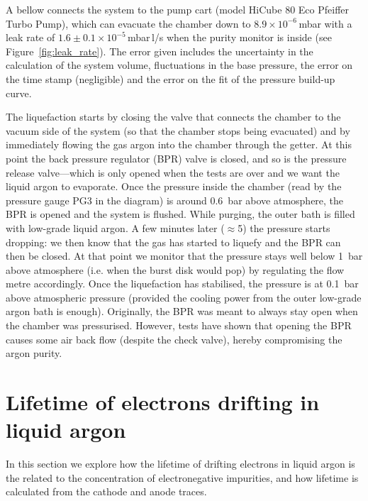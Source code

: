\documentclass[a4paper,11pt]{article}
\begin{document}
A bellow connects the system to the pump cart (model HiCube 80 Eco Pfeiffer Turbo Pump), which can evacuate the chamber down to $8.9\times10^{-6}$\,mbar with a leak rate of $1.6\pm0.1\times10^{-5}$\,mbar\,l/s when the purity monitor is inside (see Figure~\ref{fig:leak_rate}). The error given includes the uncertainty in the calculation of the system volume, fluctuations in the base pressure, the error on the time stamp (negligible) and the error on the fit of the pressure build-up curve.

The liquefaction starts by closing the valve that connects the chamber to the vacuum side of the system (so that the chamber stops being evacuated) and by immediately flowing the gas argon into the chamber through the getter. At this point the back pressure regulator (BPR) valve is closed, and so is the pressure release valve---which is only opened when the tests are over and we want the liquid argon to evaporate. Once the pressure inside the chamber (read by the pressure gauge PG3 in the diagram) is around \SI{0.6}{bar} above atmosphere, the BPR is opened and the system is flushed. While purging, the outer bath is filled with low-grade liquid argon. A few minutes later ($\approx$5) the pressure starts dropping: we then know that the gas has started to liquefy and the BPR can then be closed. At that point we monitor that the pressure stays well below \SI{1}{bar} above atmosphere (i.e. when the burst disk would pop) by regulating the flow metre accordingly. Once the liquefaction has stabilised, the pressure is at \SI{0.1}{bar} above atmospheric pressure (provided the cooling power from the outer low-grade argon bath is enough). Originally, the BPR was meant to always stay open when the chamber was pressurised. However, tests have shown that opening the BPR causes some air back flow (despite the check valve), hereby compromising the argon purity.

\section{Lifetime of electrons drifting in liquid argon}
\label{sec:calculation_lifetime}
In this section we explore how the lifetime of drifting electrons in liquid argon is the related to the concentration of electronegative impurities, and how lifetime is calculated from the cathode and anode traces.

\end{document}
